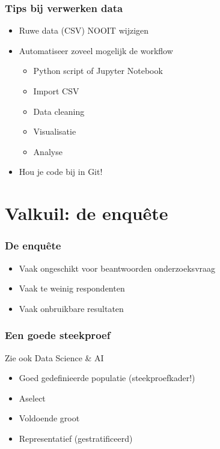 \documentclass[aspectratio=169]{beamer}
\begin{document}
\begin{frame}
  \frametitle{Tips bij verwerken data}

  \begin{itemize}
    \item Ruwe data (CSV) NOOIT wijzigen
    \item Automatiseer zoveel mogelijk de workflow
          \begin{itemize}
            \item Python script of Jupyter Notebook
            \item Import CSV
            \item Data cleaning
            \item Visualisatie
            \item Analyse
          \end{itemize}
    \item Hou je code bij in Git!
  \end{itemize}


\end{frame}

\section{Valkuil: de enquête}

\begin{frame}
  \frametitle{De enquête}


  \bigskip

  \begin{itemize}
    \item Vaak ongeschikt voor beantwoorden onderzoeksvraag
    \item Vaak te weinig respondenten
    \item Vaak onbruikbare resultaten
  \end{itemize}

\end{frame}

\begin{frame}
  \frametitle{Een goede steekproef}

  Zie ook Data Science \& AI

  \begin{itemize}
    \item Goed gedefinieerde populatie (steekproefkader!)
    \item Aselect
    \item Voldoende groot
    \item Representatief (gestratificeerd)
  \end{itemize}

\end{frame}
\end{document}
